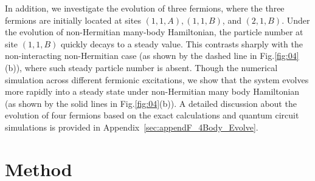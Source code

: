 \documentclass[longbibliography, aps, prx, amsmath, amssymb, amsfonts, twocolumn,superscriptaddress, footinbib]{revtex4-1}
\begin{document}
	In addition, we investigate the evolution of three fermions, where the three fermions are initially located at sites $(1,1,A), (1,1,B)$, and $(2,1,B)$. 
	Under the evolution of non-Hermitian many-body Hamiltonian, the particle number at site $(1,1,B)$ quickly decays to a steady value.
	This contrasts sharply with the non-interacting non-Hermitian case (as shown by the dashed line in Fig.\ref{fig:04}(b)), where such steady particle number is absent.
	Though the numerical simulation across different fermionic excitations, we show that the system evolves more rapidly into a steady state under non-Hermitian many body Hamiltonian (as shown by the solid lines in Fig.\ref{fig:04}(b)). 
	A detailed discussion about the evolution of four fermions based on the exact calculations and quantum circuit simulations is provided in Appendix~\ref{sec:appendF_4Body_Evolve}.



	\section{Method~\label{sec:method}}
\end{document}
